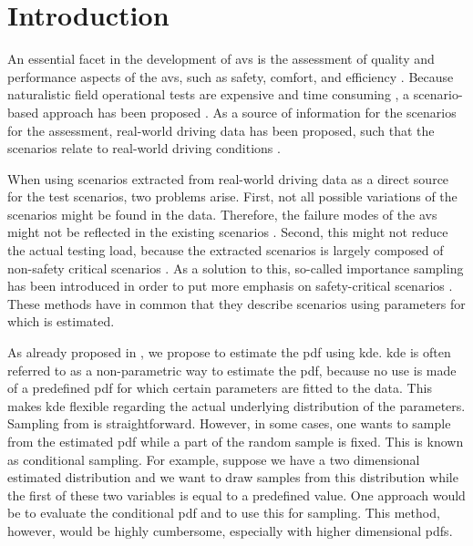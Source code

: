 \section{Introduction}
\label{sec:introduction}

An essential facet in the development of \acp{av} is the assessment of quality and performance aspects of the \acp{av}, such as safety, comfort, and efficiency \autocite{bengler2014threedecades, stellet2015taxonomy, koopman2016challenges}. 
Because naturalistic field operational tests are expensive and time consuming \autocite{kalra2016driving, zhao2018evaluation}, a scenario-based approach has been proposed \autocite{riedmaier2020survey}.
As a source of information for the scenarios for the assessment, real-world driving data has been proposed, such that the scenarios relate to real-world driving conditions \autocite{elrofai2018scenario, putz2017pegasus, krajewski2018highD}.

When using scenarios extracted from real-world driving data as a direct source for the test scenarios, two problems arise.
First, not all possible variations of the scenarios might be found in the data. 
Therefore, the failure modes of the \acp{av} might not be reflected in the existing scenarios \autocite{zhao2018evaluation}.
Second, this might not reduce the actual testing load, because the extracted scenarios is largely composed of non-safety critical scenarios \autocite{zhao2018evaluation}.
As a solution to this, so-called importance sampling has been introduced in order to put more emphasis on safety-critical scenarios \autocite{deGelder2017assessment, xu2018accelerated, zhao2018evaluation, jesenski2020scalable}.
These methods \autocite{deGelder2017assessment, xu2018accelerated, zhao2018evaluation, jesenski2020scalable} have in common that they describe scenarios using parameters for which  is estimated.

As already proposed in \autocite{deGelder2017assessment}, we propose to estimate the \ac{pdf} using \ac{kde}.
\ac{kde} \autocite{parzen1962estimation, rosenblatt1956remarks} is often referred to as a non-parametric way to estimate the \ac{pdf}, because no use is made of a predefined \ac{pdf} for which certain parameters are fitted to the data. 
This makes \ac{kde} flexible regarding the actual underlying distribution of the parameters.
Sampling from  is straightforward.
However, in some cases, one wants to sample from the estimated \ac{pdf} while a part of the random sample is fixed.
This is known as conditional sampling. 
For example, suppose we have a two dimensional estimated distribution and we want to draw samples from this distribution while the first of these two variables is equal to a predefined value. 
One approach would be to evaluate the conditional \ac{pdf} and to use this for sampling.
This method, however, would be highly cumbersome, especially with higher dimensional \acp{pdf}. 

